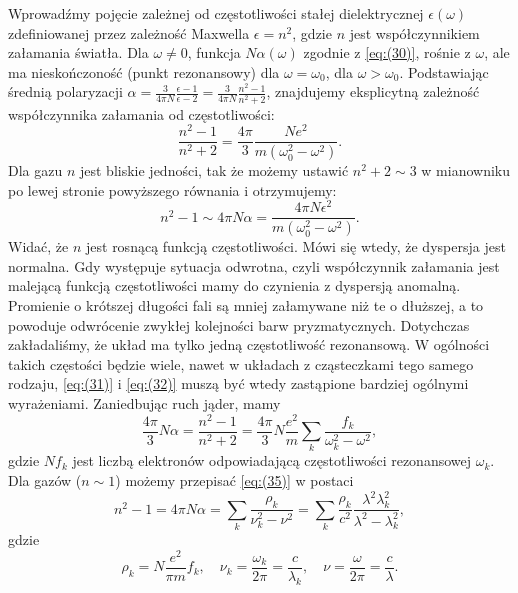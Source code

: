 Wprowadźmy pojęcie zależnej od częstotliwości stałej dielektrycznej $\epsilon(\omega)$ zdefiniowanej przez zależność Maxwella $\epsilon = n^2$, gdzie $n$ jest współczynnikiem załamania światła. Dla $\omega \neq 0$, funkcja $N\alpha(\omega)$ zgodnie z \ref{eq:(30)}, rośnie z $\omega$, ale ma nieskończoność (punkt rezonansowy) dla $\omega = \omega_0$, dla $\omega>\omega_0$. Podstawiając średnią polaryzacji $\alpha = \frac{3}{4\pi N}\frac{\epsilon - 1}{\epsilon - 2} = \frac{3}{4\pi N}\frac{n^2 -1}{n^2 +2}$, znajdujemy eksplicytną zależność współczynnika załamania od częstotliwości:
\begin{equation}\label{eq:(31)}
    \frac{n^2 - 1}{n^2 +2} = \frac{4\pi}{3}\frac{Ne^2}{m(\omega_0^2-\omega^2)}.
\end{equation}
Dla gazu $n$ jest bliskie jedności, tak że możemy ustawić $n^2+2\sim 3$ w mianowniku po lewej stronie powyższego równania i otrzymujemy:
\begin{equation}\label{eq:(32)}
    n^2-1\sim4\pi N \alpha = \frac{4 \pi N \epsilon^2}{m(\omega_0^2 - \omega^2)}.
\end{equation}
Widać, że $n$ jest rosnącą funkcją częstotliwości. Mówi się wtedy, że dyspersja jest normalna. Gdy występuje sytuacja odwrotna, czyli współczynnik załamania jest malejącą funkcją częstotliwości mamy do czynienia z dyspersją anomalną.
Promienie o krótszej długości fali są mniej załamywane niż te o dłuższej, a to powoduje odwrócenie zwykłej kolejności barw pryzmatycznych. Dotychczas zakładaliśmy, że układ ma tylko jedną częstotliwość rezonansową. W ogólności takich częstości będzie wiele, nawet w układach z cząsteczkami tego samego rodzaju, \ref{eq:(31)} i \ref{eq:(32)} muszą być wtedy zastąpione bardziej ogólnymi wyrażeniami. Zaniedbując ruch jąder, mamy 
\begin{equation}\label{eq:(35)}
    \frac{4\pi}{3}N\alpha=\frac{n^2-1}{n^2+2}=\frac{4\pi}{3}N\frac{e^2}{m}\sum_{k}^{}\frac{f_k}{\omega_k^2-\omega^2}, 
\end{equation}
gdzie $Nf_k$ jest liczbą elektronów odpowiadającą częstotliwości rezonansowej $\omega_k$. Dla gazów ($n\sim1$) możemy przepisać \ref{eq:(35)} w postaci
\begin{equation}\label{eq:(36)}
    n^2-1=4\pi N \alpha = \sum_{k}^{} \frac{\rho_k}{\nu_k^2-\nu^2}=\sum_{k}^{}\frac{\rho_k}{c^2}\frac{\lambda^2\lambda_k^2}{\lambda^2-\lambda^2_k},
\end{equation}
gdzie
$$\rho_k=N\frac{e^2}{\pi m}f_k,\quad \nu_k=\frac{\omega_k}{2\pi}=\frac{c}{\lambda_k},\quad \nu=\frac{\omega}{2\pi}=\frac{c}{\lambda}.$$
